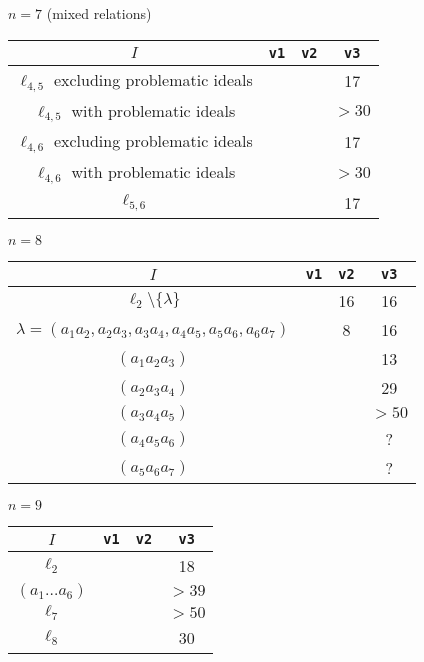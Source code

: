 \documentclass{article}
\begin{document}
\begin{flushleft}
\begin{center}
      $n=7$ (mixed relations)

      \begin{longtable}{|c|c|c|c|}
         \hline
         $I$ & \texttt{v1} & \texttt{v2} & \texttt{v3} \\
         \hline
         $\ell_{4,5}$ excluding problematic ideals &&& 17 \\
         \rowcolor{red!50!white}
         $\ell_{4,5}$ with problematic ideals &&& $>30$ \\
         $\ell_{4,6}$ excluding problematic ideals &&& 17 \\
         \rowcolor{red!50!white}
         $\ell_{4,6}$ with problematic ideals &&& $>30$ \\
         $\ell_{5,6}$ &&& 17 \\
         \hline
      \end{longtable}

      $n=8$
      \begin{longtable}{|c|c|c|c|}
         \hline
         $I$ & \texttt{v1} & \texttt{v2} & \texttt{v3} \\
         \hline
         $\ell_2 \setminus \{\lambda\}$ && 16 & 16\\
         $\lambda = (a_1a_2, a_2a_3, a_3a_4, a_4a_5, a_5a_6, a_6a_7)$ && 8 & 16 \\
         $(a_1a_2a_3)$ &&& 13 \\
         $(a_2a_3a_4)$ &&& 29 \\
         \rowcolor{red!50!white}
         $(a_3a_4a_5)$ &&& $>50$ \\
         $(a_4a_5a_6)$ &&&  ?\\
         $(a_5a_6a_7)$ &&&  ?\\
         \hline
      \end{longtable}

      $n = 9$
      \begin{longtable}{|c|c|c|c|}
         \hline
         $I$ & \texttt{v1} & \texttt{v2} & \texttt{v3} \\
         \hline
         $\ell_2$ &&& 18 \\
         \hline
         \rowcolor{red!50!white}
         $(a_1 \ldots a_6)$ &&& $>39$ \\
         \rowcolor{red!50!white}
         $\ell_7$ &&& $>50$ \\
         \hline
         $\ell_8$ &&& 30 \\
         \hline
      \end{longtable}
      

\end{center}
\end{flushleft}
\end{document}

